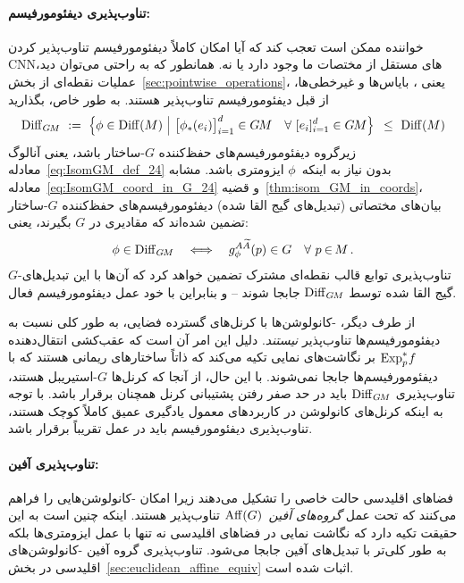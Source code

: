 \paragraph{تناوب‌پذیری دیفئومورفیسم:}
خواننده ممکن است تعجب کند که آیا امکان کاملاً دیفئومورفیسم تناوب‌پذیر کردن CNNهای مستقل از مختصات ما وجود دارد یا نه.
همانطور که به راحتی می‌توان دید، عملیات نقطه‌ای از بخش~\ref{sec:pointwise_operations}، یعنی \onexones، بایاس‌ها و غیرخطی‌ها، از قبل دیفئومورفیسم تناوب‌پذیر هستند.
به طور خاص، بگذارید
\begin{align}\label{eq:DiffGM_def_part1}
	\DiffGM\ :=\ \pig\{ \phi \in \Diff(M) \ \pig|\ 
	\big[\phi_*(e_i)\big]_{i=1}^d \in \GM \quad \forall\ [e_i]_{i=1}^d \in \GM \pig\} \,\ \leq\ \Diff(M)
\end{align}
زیرگروه دیفئومورفیسم‌های حفظ‌کننده $G$-ساختار باشد، یعنی آنالوگ معادله~\eqref{eq:IsomGM_def_24} بدون نیاز به اینکه~$\phi$ ایزومتری باشد.
مشابه معادله~\eqref{eq:IsomGM_coord_in_G_24} و قضیه~\ref{thm:isom_GM_in_coords}، بیان‌های مختصاتی (تبدیل‌های گیج القا شده) دیفئومورفیسم‌های حفظ‌کننده $G$-ساختار تضمین شده‌اند که مقادیری در $G$ بگیرند، یعنی:
\begin{align}
	\phi \in \operatorname{Diff}_{G\mkern-1.4muM} \quad \Longleftrightarrow \quad g_\phi^{A\widetilde{A}}(p) \in G\ \ \ \forall\ p \mkern-1mu\in\mkern-2mu M \,.
\end{align}
$G$-تناوب‌پذیری توابع قالب نقطه‌ای مشترک تضمین خواهد کرد که آن‌ها با این تبدیل‌های گیج القا شده توسط $\operatorname{Diff}_{G\mkern-1.4muM}$ جابجا شوند -- و بنابراین با خود عمل دیفئومورفیسم فعال.


از طرف دیگر، \GM-کانولوشن‌ها با کرنل‌های گسترده فضایی، به طور کلی نسبت به دیفئومورفیسم‌ها تناوب‌پذیر \emph{نیستند}.
دلیل این امر آن است که عقب‌کشی انتقال‌دهنده $\operatorname{Exp}^*_p\mkern-2mu f$ بر نگاشت‌های نمایی تکیه می‌کند که ذاتاً ساختارهای ریمانی هستند که با دیفئومورفیسم‌ها جابجا نمی‌شوند.
با این حال، از آنجا که کرنل‌ها $G$-استیریبل هستند، تناوب‌پذیری $\operatorname{Diff}_{G\mkern-1.4muM}$ باید در حد صفر رفتن پشتیبانی کرنل همچنان برقرار باشد.
با توجه به اینکه کرنل‌های کانولوشن در کاربردهای معمول یادگیری عمیق کاملاً کوچک هستند، تناوب‌پذیری دیفئومورفیسم باید در عمل تقریباً برقرار باشد.



\paragraph{تناوب‌پذیری آفین:}
فضاهای اقلیدسی حالت خاصی را تشکیل می‌دهند زیرا امکان \GM-کانولوشن‌هایی را فراهم می‌کنند که تحت عمل \emph{گروه‌های آفین}~$\operatorname{Aff}(G)$ تناوب‌پذیر هستند.
اینکه چنین است به این حقیقت تکیه دارد که نگاشت نمایی در فضاهای اقلیدسی نه تنها با عمل ایزومتری‌ها بلکه به طور کلی‌تر با تبدیل‌های آفین جابجا می‌شود.
تناوب‌پذیری گروه آفین \GM-کانولوشن‌های اقلیدسی در بخش~\ref{sec:euclidean_affine_equiv} اثبات شده است.